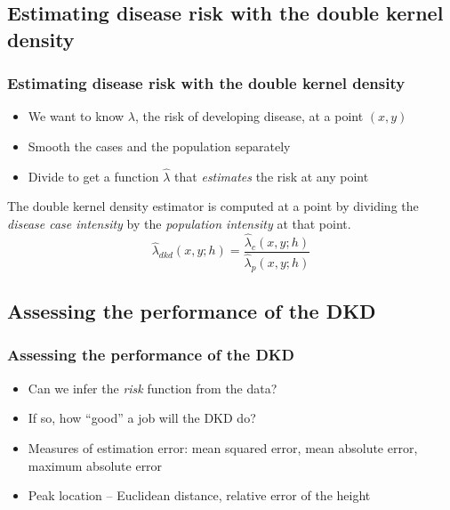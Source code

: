 \documentclass{beamer}
\theoremstyle{definition}
\begin{document}
\subsection{Estimating disease risk with the double kernel density}
\begin{frame}\frametitle{Estimating disease risk with the double kernel density}
    \begin{itemize}
        \item We want to know $\lambda$, the risk of developing disease, at a point $(x,y)$
        \item Smooth the cases and the population separately
        \item Divide to get a function \textbf{$\hat{\lambda}$} that \emph{estimates} the risk at any point
    \end{itemize}
    \begin{definition}
        The \alert{double kernel density} estimator is computed at a point by dividing the \emph{disease case intensity} by the \emph{population intensity} at that point.
        \begin{equation*}
            \hat{\lambda}_{dkd}(x,y;h) = \frac{ \hat{\lambda}_{c}(x,y;h) } { \hat{\lambda}_{p}(x,y;h) }
        \end{equation*}
    \end{definition}
\end{frame}

\subsection{Assessing the performance of the DKD}
\begin{frame}\frametitle{Assessing the performance of the DKD}
    \begin{itemize}
        \item Can we infer the \emph{risk} function from the data?
        \item If so, how ``good'' a job will the DKD do?
        \item Measures of estimation error: mean squared error, mean absolute error, maximum absolute error
        \item Peak location -- Euclidean distance, relative error of the height
    \end{itemize}
\end{frame}

\end{document}
